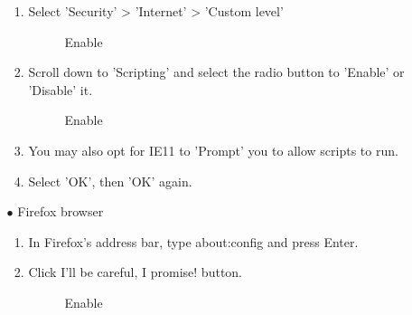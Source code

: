 \documentclass[14pt, a4paper]{article}
\begin{document}
\begin{enumerate}
\begin{enumerate}
\begin{enumerate}
       \item Select 'Security' > 'Internet' > 'Custom level'
       \begin{figure}[H]
       \centerline{}
		\caption{Enable}
      \end{figure}
       \item Scroll down to 'Scripting' and select the radio button to 'Enable' or 'Disable' it. 
       \begin{figure}[H]
       \centerline{}
		\caption{Enable}
      \end{figure}
       \item You may also opt for IE11 to 'Prompt' you to allow scripts to run.
       \item Select 'OK', then 'OK' again.
     \end{enumerate}

  
    \item[$\bullet$]  Firefox browser
    \begin{enumerate}
   
       \item In Firefox's address bar, type about:config and press Enter.
       \item Click I'll be careful, I promise! button.
     \begin{figure}[H]
       \centerline{}
		\caption{Enable}
      \end{figure}       
       

\end{enumerate}
\end{enumerate}
\end{enumerate}
\end{document}
